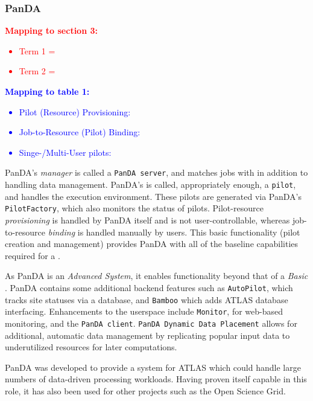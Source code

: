 \documentclass{sig-alternate}
\begin{document}
\subsubsection{PanDA}

\textcolor{red}
{
\textbf{Mapping to section 3:}
\begin{itemize}
\item Term 1 =
\item Term 2 =
\end{itemize}
}

\textcolor{blue}
{
\textbf{Mapping to table 1:}
\begin{itemize}
\item Pilot (Resource) Provisioning:
\item Job-to-Resource (Pilot) Binding:
\item Singe-/Multi-User pilots:
\end{itemize}
}

PanDA's \textit{manager} is called a \texttt{PanDA server}, and matches
jobs with \pilots in addition to handling data management.
PanDA's \textit{\pilot}
is called, appropriately enough, a \texttt{pilot}, and handles the execution
environment.  These pilots are generated via PanDA's \texttt{PilotFactory},
which also monitors the status of pilots.
Pilot-resource \textit{provisioning} is handled by PanDA itself and is not 
user-controllable, whereas job-to-resource \textit{binding} is handled
manually by users.
This basic functionality (pilot creation and management) provides 
PanDA with all of the baseline capabilities required for a \pilotjob.

As PanDA is an \textit{Advanced \pilotjob System}, it enables functionality
beyond that of a \textit{Basic \pilotjob}.
PanDA contains some additional backend features such as \texttt{AutoPilot}, which
tracks site statuses via a database, and \texttt{Bamboo} which adds
ATLAS database interfacing.  Enhancements to the userspace include 
\texttt{Monitor}, for web-based monitoring, and the \texttt{PanDA client}.
\texttt{PanDA Dynamic Data Placement} \cite{maeno_pd2p:_2012} 
allows for additional, automatic data
management by replicating popular input data to underutilized resources
for later computations.

PanDA was developed to provide a \pilotjob system for ATLAS which could
handle large numbers of data-driven processing workloads.  Having proven itself
capable in this role, it has also been used for other projects such
as the Open Science Grid.
\end{document}
